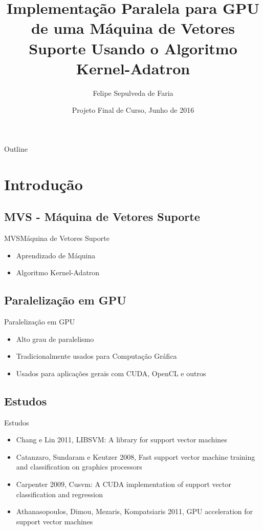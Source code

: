 \documentclass{beamer}
\title{Implementação Paralela para GPU de uma Máquina de Vetores Suporte Usando o Algoritmo Kernel-Adatron}
\author{Felipe Sepulveda de Faria}
\institute[Universidade Federal do Rio de Janeiro]
{
  Departamento de Ciência da Computação\\
  Universidade Federal do Rio de Janeiro
}
\date{Projeto Final de Curso, Junho de 2016}
\begin{document}
\begin{frame}
  \titlepage
\end{frame}

\begin{frame}{Outline}
  \tableofcontents
\end{frame}

\section{Introdução}

\subsection{MVS - Máquina de Vetores Suporte}

\begin{frame}{MVS}{Máquina de Vetores Suporte}
  \begin{itemize}
  \item {
    Aprendizado de Máquina
  }
  \item {
    Algoritmo Kernel-Adatron
  }
  \end{itemize}
\end{frame}

\subsection{Paralelização em GPU}

\begin{frame}{Paralelização em GPU}
  \begin{itemize}
  \item {
    Alto grau de paralelismo
  }
  \item {   
    Tradicionalmente usados para Computação Gráfica
  }
  \item {
    Usados para aplicações gerais com CUDA, OpenCL e outros
  }
  \end{itemize}
\end{frame}

\subsection{Estudos}

\begin{frame}{Estudos}
  \begin{itemize}
  \item {
    Chang e Lin 2011, LIBSVM: A library for support vector machines
  }
  \item {   
    Catanzaro, Sundaram e Keutzer 2008, Fast support vector machine training and classification on graphics processors
  }
  \item {
    Carpenter 2009, Cusvm: A CUDA implementation of support vector classification and regression
  }
  \item {
    Athanasopoulos, Dimou, Mezaris, Kompatsiaris 2011, GPU acceleration for support vector machines
  }
  \end{itemize}
\end{frame}
\end{document}
